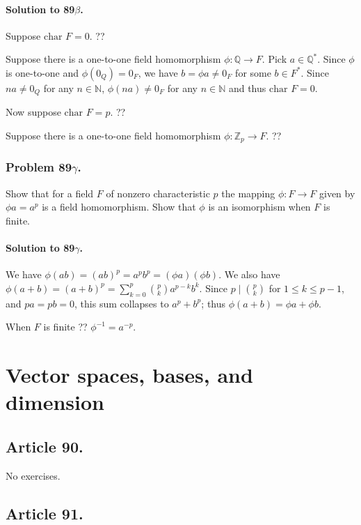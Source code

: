 \paragraph*{Solution to 89$\beta$.}
Suppose $\mbox{char } F = 0$. ??

Suppose there is a one-to-one field homomorphism $\phi : \mathbb{Q} \rightarrow F$.
Pick $a \in \mathbb{Q}^*$. Since $\phi$ is one-to-one and $\phi (0_Q) = 0_F$, we
have $b = \phi a \neq 0_F$ for some $b \in F^*$. Since $na \neq 0_Q$ for any
$n \in \mathbb{N}$, $\phi (na) \neq 0_F$ for any $n \in \mathbb{N}$ and thus
$\mbox{char } F = 0$.

Now suppose $\mbox{char } F = p$. ??

Suppose there is a one-to-one field homomorphism $\phi : \mathbb{Z}_p \rightarrow F$.
??

\subsubsection{Problem 89$\gamma$.}
Show that for a field $F$ of nonzero characteristic $p$ the mapping
$\phi : F \rightarrow F$ given by $\phi a = a^p$ is a field homomorphism. Show
that $\phi$ is an isomorphism when $F$ is finite.

\paragraph*{Solution to 89$\gamma$.}
We have $\phi(ab) = (ab)^p = a^p b^p = (\phi a)(\phi b)$. We also have
$\phi(a+b) = (a+b)^p = \sum_{k=0}^p \binom{p}{k} a^{p-k} b^{k}$.
Since $p \mid \binom{p}{k}$ for $1 \leq k \leq p-1$, and $pa = pb = 0$, this
sum collapses to $a^p + b^p$; thus $\phi(a+b) = \phi a + \phi b$.

When $F$ is finite ?? $\phi^{-1} = a^{-p}$.


\section{Vector spaces, bases, and dimension}


\subsection{Article 90.}

No exercises.
\subsection{Article 91.}

